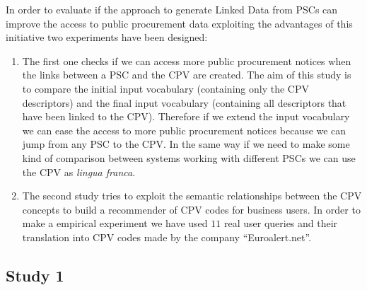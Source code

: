 In order to evaluate if the approach to generate Linked Data from PSCs can improve the access to public procurement data 
exploiting the advantages of this initiative two experiments have been designed:
\begin{enumerate}
 \item The first one checks if we can access more public procurement notices when the links between a PSC and the CPV are created. 
 The aim of this study is to compare the initial input vocabulary (containing only the CPV descriptors) and the final 
 input vocabulary (containing all descriptors that have been linked to the CPV). Therefore if we extend the input vocabulary we can ease the access to 
 more public procurement notices because we can jump from any PSC to the CPV. In the same way if we need to make some kind of comparison 
 between systems working with different PSCs we can use the CPV as \textit{lingua franca}.
 
 \item The second study tries to exploit the semantic relationships between the CPV concepts to build a recommender of CPV codes for business users. 
 In order to make a empirical experiment we have used $11$ real user queries and their translation into CPV codes made by the company ``Euroalert.net''.
\end{enumerate}

\subsection{Study 1}
